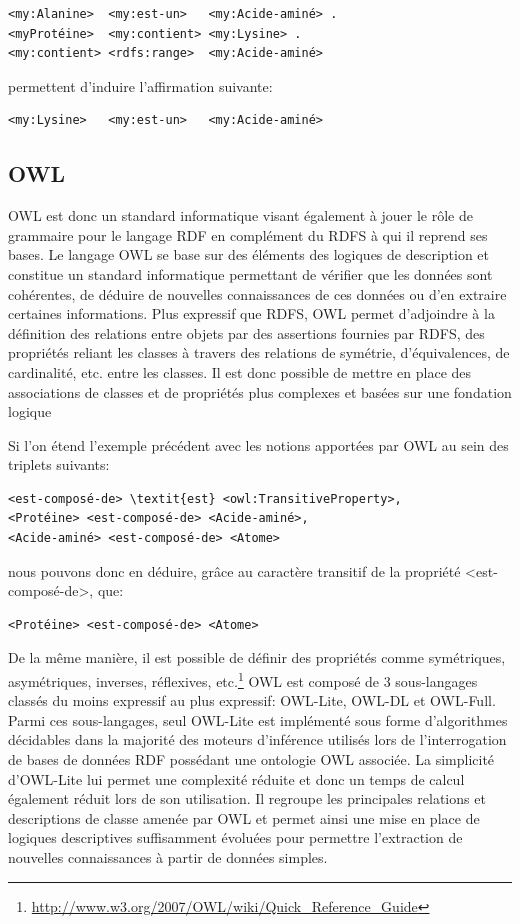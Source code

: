 \begin{lstlisting}
<my:Alanine>  <my:est-un>   <my:Acide-aminé> .
<myProtéine>  <my:contient> <my:Lysine> .
<my:contient> <rdfs:range>  <my:Acide-aminé> 
\end{lstlisting}

permettent d'induire l'affirmation suivante:

\begin{lstlisting}
<my:Lysine>   <my:est-un>   <my:Acide-aminé>
\end{lstlisting}

\subsection{OWL} \label{owl}

OWL est donc un standard informatique visant également à jouer le rôle de grammaire pour le langage RDF en complément du RDFS à qui il reprend ses bases. Le langage OWL se base sur des éléments des logiques de description et constitue un standard informatique permettant de vérifier que les données sont cohérentes, de déduire de nouvelles connaissances de ces données ou d'en extraire certaines informations.
Plus expressif que RDFS, OWL permet d'adjoindre à la définition des relations entre objets par des assertions fournies par RDFS, des propriétés reliant les classes à travers des relations de symétrie, d'équivalences, de cardinalité, etc. entre les classes. 
Il est donc possible de mettre en place des associations de classes et de propriétés plus complexes et basées sur une fondation logique  

Si l'on étend l'exemple précédent avec les notions apportées par OWL au sein des triplets suivants:

\begin{lstlisting}
<est-composé-de> \textit{est} <owl:TransitiveProperty>,
<Protéine> <est-composé-de> <Acide-aminé>,
<Acide-aminé> <est-composé-de> <Atome>
\end{lstlisting}

nous pouvons donc en déduire, grâce au caractère transitif de la propriété <est-composé-de>, que:

\begin{lstlisting}
<Protéine> <est-composé-de> <Atome>
\end{lstlisting}

De la même manière, il est possible de définir des propriétés comme symétriques, asymétriques, inverses, réflexives, etc.\footnote{\url{http://www.w3.org/2007/OWL/wiki/Quick_Reference_Guide}}
OWL est composé de 3 sous-langages classés du moins expressif au plus expressif: OWL-Lite, OWL-DL et OWL-Full. Parmi ces sous-langages, seul OWL-Lite est implémenté sous forme d'algorithmes décidables dans la majorité des moteurs d'inférence utilisés lors de l'interrogation de bases de données RDF possédant une ontologie OWL associée. La simplicité d'OWL-Lite lui permet une complexité réduite et donc un temps de calcul également réduit lors de son utilisation. Il regroupe les principales relations et descriptions de classe amenée par OWL et permet ainsi une mise en place de logiques descriptives suffisamment évoluées pour permettre l'extraction de nouvelles connaissances à partir de données simples.

